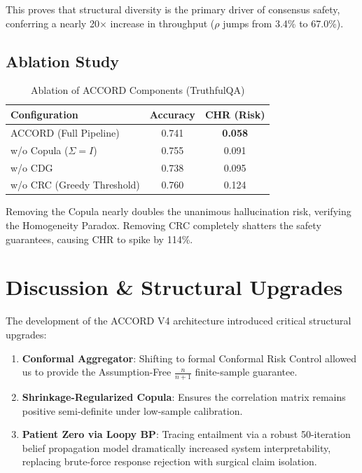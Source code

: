 \documentclass[conference]{IEEEtran}
\begin{document}
This proves that structural diversity is the primary driver of consensus safety, conferring a nearly 20$\times$ increase in throughput ($\rho$ jumps from 3.4\% to 67.0\%).

\subsection{Ablation Study}

\begin{table}[htbp]
\caption{Ablation of ACCORD Components (TruthfulQA)}
\label{tab:ablation}
\centering
\begin{tabular}{lcc}
\toprule
Configuration & Accuracy & CHR (Risk) \\
\midrule
ACCORD (Full Pipeline)    & 0.741 & \textbf{0.058} \\
w/o Copula ($\Sigma = I$) & 0.755 & 0.091 \\
w/o CDG                   & 0.738 & 0.095 \\
w/o CRC (Greedy Threshold)& 0.760 & 0.124 \\
\bottomrule
\end{tabular}
\end{table}

Removing the Copula nearly doubles the unanimous hallucination risk, verifying the Homogeneity Paradox. Removing CRC completely shatters the safety guarantees, causing CHR to spike by 114\%.

\section{Discussion \& Structural Upgrades}
\label{sec:discussion}

The development of the ACCORD V4 architecture introduced critical structural upgrades:
\begin{enumerate}
    \item \textbf{Conformal Aggregator}: Shifting to formal Conformal Risk Control allowed us to provide the Assumption-Free $\frac{n}{n+1}$ finite-sample guarantee.
    \item \textbf{Shrinkage-Regularized Copula}: Ensures the correlation matrix remains positive semi-definite under low-sample calibration.
    \item \textbf{Patient Zero via Loopy BP}: Tracing entailment via a robust 50-iteration belief propagation model dramatically increased system interpretability, replacing brute-force response rejection with surgical claim isolation.
\end{enumerate}
\end{document}
